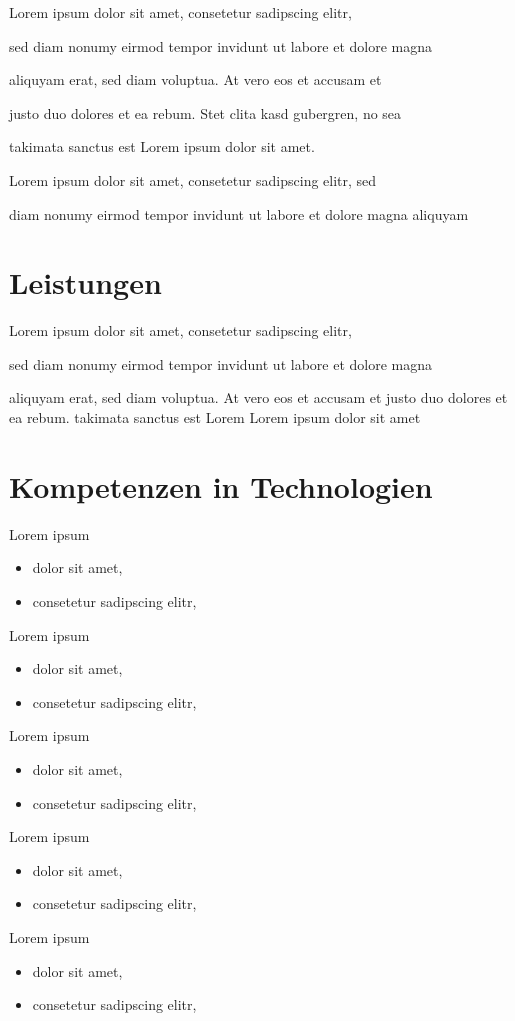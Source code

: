 \documentclass[11pt,a4paper,oneside,twocolumn=true]{report}
\begin{document}
\begin{multicols}{2}
	  Lorem ipsum dolor sit amet, consetetur sadipscing elitr, 

	sed diam nonumy eirmod tempor invidunt ut labore et dolore magna

	 aliquyam erat, sed diam voluptua. At vero eos et accusam et 

	justo duo dolores et ea rebum. Stet clita kasd gubergren, no sea

	 takimata sanctus est Lorem ipsum dolor sit amet. 

	Lorem ipsum dolor sit amet, consetetur sadipscing elitr, sed 

	diam nonumy eirmod tempor invidunt ut labore et dolore magna aliquyam
	
	\section{Leistungen}
	  Lorem ipsum dolor
	  sit amet, consetetur
	  sadipscing elitr, 

	sed 
	   diam nonumy 
	   eirmod tempor 
	   invidunt ut labore et dolore magna

	 aliquyam
	    erat, sed diam voluptua.
	    At vero eos et accusam et 
	   justo duo dolores et ea rebum.  
	    takimata sanctus est Lorem  
	   Lorem ipsum dolor sit amet	
	
	\section{Kompetenzen in Technologien}
	  Lorem ipsum
	\begin{itemize} 
	\item dolor sit amet, 
	 \item consetetur sadipscing elitr, 
    \end{itemize}
	  Lorem ipsum
	\begin{itemize} 
	\item dolor sit amet, 
	 \item consetetur sadipscing elitr, 
    \end{itemize}
	  Lorem ipsum
	\begin{itemize} 
	\item dolor sit amet, 
	 \item consetetur sadipscing elitr, 
    \end{itemize}
	  Lorem ipsum
	\begin{itemize} 
	\item dolor sit amet, 
	 \item consetetur sadipscing elitr, 
    \end{itemize}
	  Lorem ipsum
	\begin{itemize} 
	\item dolor sit amet, 
	 \item consetetur sadipscing elitr, 
    \end{itemize}
	
\end{multicols}
\end{document}
